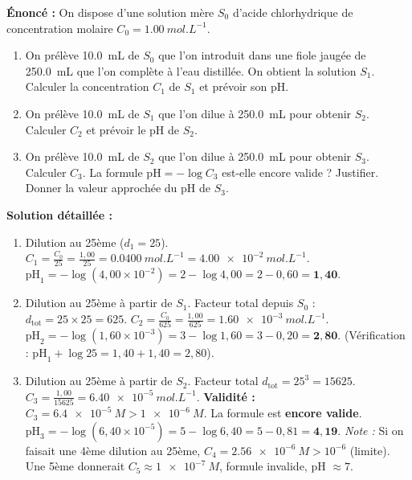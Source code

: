 \documentclass[11pt]{article}
\begin{document}
\begin{exoresolu}
\textbf{Énoncé :} On dispose d'une solution mère $S_0$ d'acide chlorhydrique de concentration molaire $C_0 = \SI{1,00}{mol.L^{-1}}$.
\begin{enumerate}
  \item On prélève \SI{10,0}{mL} de $S_0$ que l'on introduit dans une fiole jaugée de \SI{250,0}{mL} que l'on complète à l'eau distillée. On obtient la solution $S_1$. Calculer la concentration $C_1$ de $S_1$ et prévoir son pH.
  \item On prélève \SI{10,0}{mL} de $S_1$ que l'on dilue à \SI{250,0}{mL} pour obtenir $S_2$. Calculer $C_2$ et prévoir le pH de $S_2$.
  \item On prélève \SI{10,0}{mL} de $S_2$ que l'on dilue à \SI{250,0}{mL} pour obtenir $S_3$. Calculer $C_3$. La formule $\mathrm{pH} = -\log C_3$ est-elle encore valide ? Justifier. Donner la valeur approchée du pH de $S_3$.
\end{enumerate}
\tcblower
\textbf{Solution détaillée :}
\begin{enumerate}
  \item Dilution au 25ème ($d_1 = 25$). $C_1 = \frac{C_0}{25} = \frac{1,00}{25} = \SI{0,0400}{mol.L^{-1}} = \SI{4,00e-2}{mol.L^{-1}}$.
  $\mathrm{pH}_1 = -\log(4,00 \times 10^{-2}) = 2 - \log 4,00 = 2 - 0,60 = \mathbf{1,40}$.
  \item Dilution au 25ème à partir de $S_1$. Facteur total depuis $S_0$ : $d_{\text{tot}} = 25 \times 25 = 625$.
  $C_2 = \frac{C_0}{625} = \frac{1,00}{625} = \SI{1,60e-3}{mol.L^{-1}}$.
  $\mathrm{pH}_2 = -\log(1,60 \times 10^{-3}) = 3 - \log 1,60 = 3 - 0,20 = \mathbf{2,80}$.
  (Vérification : $\mathrm{pH}_1 + \log 25 = 1,40 + 1,40 = 2,80$).
  \item Dilution au 25ème à partir de $S_2$. Facteur total $d_{\text{tot}} = 25^3 = 15625$.
  $C_3 = \frac{1,00}{15625} = \SI{6,40e-5}{mol.L^{-1}}$.
  \textbf{Validité :} $C_3 = \SI{6,4e-5}{M} > \SI{1e-6}{M}$. La formule est \textbf{encore valide}.
  $\mathrm{pH}_3 = -\log(6,40 \times 10^{-5}) = 5 - \log 6,40 = 5 - 0,81 = \mathbf{4,19}$.
  \emph{Note :} Si on faisait une 4ème dilution au 25ème, $C_4 = \SI{2,56e-6}{M} > 10^{-6}$ (limite). Une 5ème donnerait $C_5 \approx \SI{1e-7}{M}$, formule invalide, pH $\approx 7$.
\end{enumerate}
\end{exoresolu}
\end{document}
